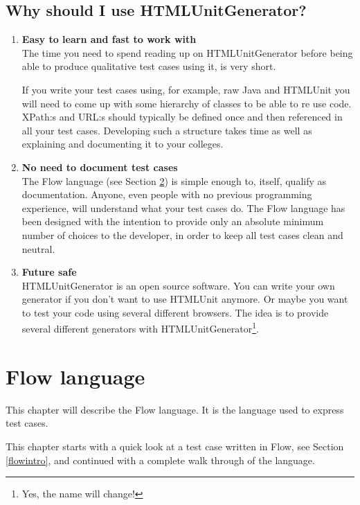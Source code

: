 \documentclass[a4paper,11pt]{kth-mag}
\begin{document}
\section{Why should I use HTMLUnitGenerator?}
\begin{enumerate}
\item \textbf{Easy to learn and fast to work with}\\
The time you need to spend reading up on HTMLUnitGenerator before being able to produce qualitative test cases using it, is very short.

If you write your test cases using, for example, raw Java and HTMLUnit you will need to come up with some hierarchy of classes to be able to re use code. XPath:s and URL:s should typically be defined once and then referenced in all your test cases. Developing such a structure takes time as well as explaining and documenting it to your colleges.

\item \textbf{No need to document test cases}\\
The Flow language (see Section \ref{flowlanguage}) is simple enough to, itself, qualify as documentation. Anyone, even people with no previous programming experience, will understand what your test cases do. The Flow language has been designed with the intention to provide only an absolute minimum number of choices to the developer, in order to keep all test cases clean and neutral.

\item \textbf{Future safe}\\
HTMLUnitGenerator is an open source software. You can write your own generator if you don't want to use HTMLUnit anymore. Or maybe you want to test your code using several different browsers. The idea is to provide several different generators with HTMLUnitGenerator\footnote{Yes, the name will change!}.
\end{enumerate}

\chapter{Flow language}
\label{flowlanguage}
This chapter will describe the Flow language. It is the language used to express test cases.

This chapter starts with a quick look at a test case written in Flow, see Section \ref{flowintro}, and continued with a complete walk through of the language. 
\end{document}
